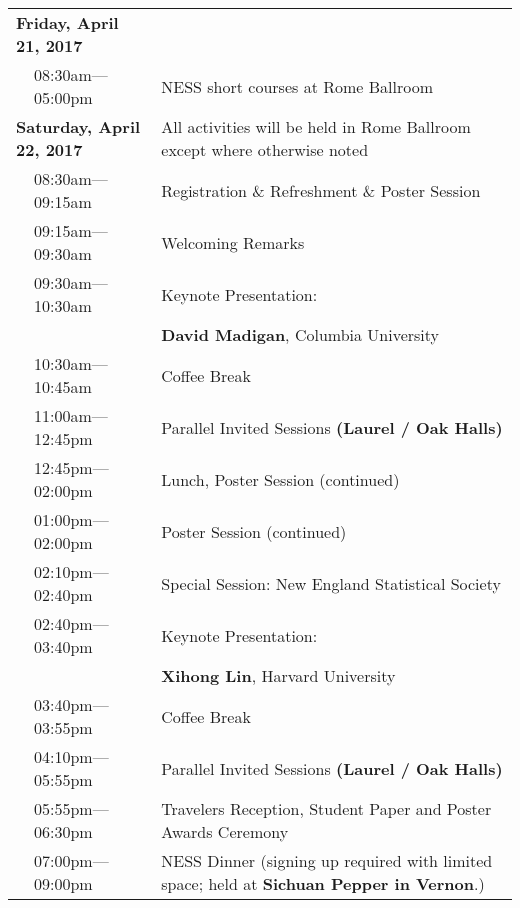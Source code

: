 
\begin{tabular}{lll}

\multicolumn{2}{l}{{\bf Friday, April 21, 2017}}  &\\[.5em]
& 08:30am---05:00pm & NESS short courses at Rome Ballroom\\[1em]

\multicolumn{2}{l}{{\bf Saturday, April 22, 2017}}
& \multicolumn{1}{p{4in}}{All activities
  will be held in Rome Ballroom except where otherwise noted}  \\[2em]

& 08:30am---09:15am
& \multicolumn{1}{p{4in}}{Registration \& Refreshment \& Poster Session} \\[.5em]
& 09:15am---09:30am & \multicolumn{1}{p{4in}}{Welcoming Remarks} \\[.5em]
& 09:30am---10:30am & \multicolumn{1}{p{4in}}{Keynote Presentation:}
  \\[.5em]
& & \multicolumn{1}{p{4in}}{\textbf{David Madigan}, Columbia University} \\[.5em]
& 10:30am---10:45am & \multicolumn{1}{p{4in}}{Coffee Break} \\[.5em]
& 11:00am---12:45pm & \multicolumn{1}{p{4in}}{Parallel Invited Sessions \textbf{(Laurel / Oak Halls)}} \\[.5em]
& 12:45pm---02:00pm & \multicolumn{1}{p{4in}}{Lunch, Poster Session (continued)} \\[.5em]
& 01:00pm---02:00pm & \multicolumn{1}{p{4in}}{Poster Session (continued)} \\[.5em]
& 02:10pm---02:40pm & \multicolumn{1}{p{4in}}{Special Session: New England Statistical Society} \\[.5em]
& 02:40pm---03:40pm & \multicolumn{1}{p{4in}}{Keynote Presentation:} \\[.5em]
& & \multicolumn{1}{p{4in}}{\textbf{Xihong Lin}, Harvard University} \\[.5em]
& 03:40pm---03:55pm & \multicolumn{1}{p{4in}}{Coffee Break} \\[.5em]
& 04:10pm---05:55pm & \multicolumn{1}{p{4in}}{Parallel Invited Sessions \textbf{(Laurel / Oak Halls)}} \\[.5em]
& 05:55pm---06:30pm & \multicolumn{1}{p{4in}}{Travelers Reception, Student Paper and Poster Awards Ceremony} \\[1.75em]
& 07:00pm---09:00pm & \multicolumn{1}{p{4in}}{NESS Dinner (signing up required with limited
                                                                        space; held at \textbf{Sichuan Pepper in Vernon}.)}
\end{tabular}

